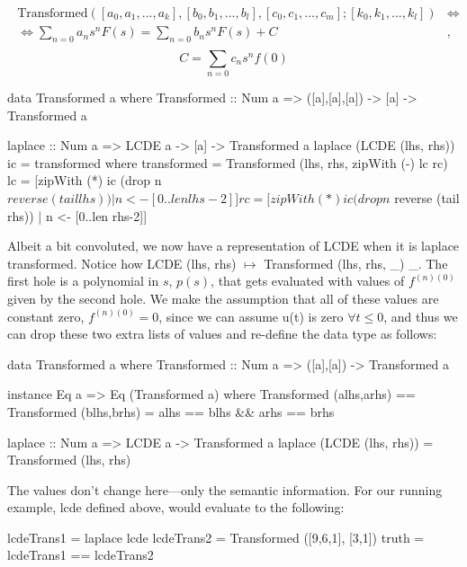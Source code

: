 \begin{align}\begin{split}
\text{Transformed}([a_0,a_1,...,a_k],[b_0,b_1,...,b_l],[c_0,c_1,...,c_m];[k_0,k_1,...,k_l]) &\iff\\\iff \sum\limits^{}_{n=0}{a_n s^n F(s)} = \sum\limits^{}_{n=0}{b_n s^n F(s)} + C&,
\end{split}\end{align}
\begin{equation}
C = \sum\limits^{}_{n=0}{c_n s^n f(0)}
\end{equation}

\begin{code}
data Transformed a where
  Transformed :: Num a => ([a],[a],[a]) -> [a] -> Transformed a

laplace :: Num a => LCDE a -> [a] -> Transformed a
laplace (LCDE (lhs, rhs)) ic = transformed where
  transformed = Transformed (lhs, rhs, zipWith (-) lc rc)
  lc = [zipWith (*) ic (drop n $ reverse (tail lhs)) | n <- [0..len lhs-2]] %
  rc = [zipWith (*) ic (drop n $ reverse (tail rhs)) | n <- [0..len rhs-2]]
\end{code}

Albeit a bit convoluted, we now have a representation of LCDE when it is laplace transformed.
Notice how LCDE (lhs, rhs) $\mapsto$ Transformed (lhs, rhs, \_) \_. The first hole
is a polynomial in $s$, $p(s)$, that gets evaluated with values of $f^{(n)(0)}$
given by the second hole. We make the assumption that all of these values are constant
zero, $f^{(n)(0)}=0$, since we can assume u(t) is zero $\forall t\leq 0$, and thus
we can drop these two extra lists of values and re-define the data type as follows:

\begin{code}
data Transformed a where
  Transformed :: Num a => ([a],[a]) -> Transformed a

instance Eq a => Eq (Transformed a) where
  Transformed (alhs,arhs) == Transformed (blhs,brhs) = alhs == blhs && arhs == brhs

laplace :: Num a => LCDE a -> Transformed a
laplace (LCDE (lhs, rhs)) = Transformed (lhs, rhs)
\end{code}

The values don't change here---only the semantic information.
For our running example, lcde defined above, would evaluate to the following:
\begin{code}
lcdeTrans1 = laplace lcde
lcdeTrans2 = Transformed ([9,6,1], [3,1])
truth = lcdeTrans1 == lcdeTrans2
\end{code}

